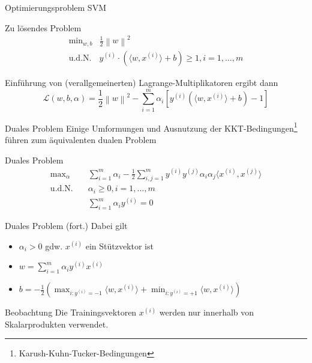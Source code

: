 \documentclass[xcolor={dvipsnames,svgnames}]{beamer}
\newcommand{\inner}[2]{\langle{} #1, #2 \rangle{}}
\newcommand{\norm}[1]{\left\lVert#1\right\rVert}
\begin{document}
\begin{frame}{Optimierungsproblem SVM}
  \begin{exampleblock}{Zu lösendes Problem}
    \[
      \begin{array}{rl}
        \text{min}_{w,b} & \frac{1}{2}\norm{w}^2 \\
        \text{u.d.N.} & y^{(i)} \cdot (\inner{w}{x^{(i)}} + b) \geq 1, i = 1, \ldots, m
      \end{array}
    \]
  \end{exampleblock}
Einführung von (verallgemeinerten) Lagrange-Multiplikatoren ergibt dann
\[
  \mathcal{L}(w,b,\alpha) = \frac{1}{2}\norm{w}^2 
    - \sum_{i=1}^m{\alpha_i \left[ y^{(i)}(\inner{w}{x^{(i)}} + b) - 1 \right]}
\]
\end{frame}

\begin{frame}{Duales Problem}
  Einige Umformungen und Ausnutzung der KKT-Bedingungen\footnote{Karush-Kuhn-Tucker-Bedingungen} führen zum äquivalenten
  dualen Problem

  \begin{exampleblock}{Duales Problem}
    \vspace{-1em}
    \begin{align*}
        \text{max}_{\alpha} \quad& \sum_{i=1}^m\alpha_i 
                              - \frac{1}{2}\sum_{i,j=1}^m y^{(i)}y^{(j)}\alpha_i\alpha_j\inner{x^{(i)}}{x^{(j)}}  \\
        \text{u.d.N.} \quad& \alpha_i \geq 0, i = 1, \ldots, m \\
                            & \sum_{i=1}^m \alpha_i y^{(i)} = 0
    \end{align*}
  \end{exampleblock}
\end{frame}

\begin{frame}{Duales Problem (fort.)}
  Dabei gilt
  \begin{itemize}
    \item $\alpha_i > 0$ gdw. $x^{(i)}$ ein Stützvektor ist
    \item $w = \sum_{i=1}^m \alpha_i y^{(i)} x^{(i)}$
    \item $b = -\frac{1}{2}(\max_{i:y^{(i)}=-1} \inner{w}{x^{(i)}} + \min_{i:y^{(i)}=+1} \inner{w}{x^{(i)}} )$
  \end{itemize}

  \begin{block}{Beobachtung}
    Die Trainingsvektoren $x^{(i)}$ werden nur innerhalb von
    Skalarprodukten verwendet.
  \end{block}
\end{frame}
\end{document}
